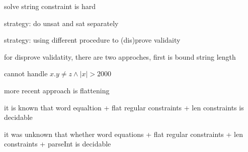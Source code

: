 
solve string constraint is hard

strategy: do unsat and sat separately

strategy: using different procedure to (dis)prove validaity

for disprove validatity, there are two approches, first is bound string length

cannot handle $x.y \neq z  \wedge |x| > 2000$

more recent approach is flattening

it is known that word equaltion + flat regular constraints + len constraints
is decidable

it was unknown that whether word equations + flat regular constraints + len constraints + parseInt is decidable

